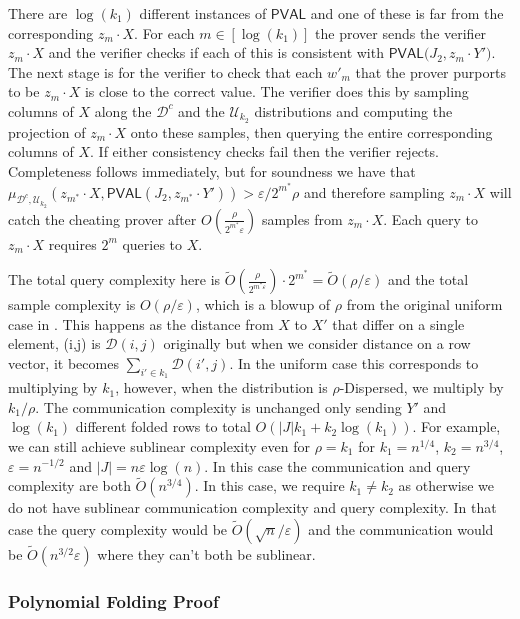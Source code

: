 \documentclass[11pt]{article}
\newcommand{\PVAL}{\mathsf{PVAL}}
\begin{document}
There are $\log (k_{1})$ different instances of $\PVAL$ and one of these is far from the corresponding $z_{m}\cdot X$. For each $m\in [\log (k_{1})]$ the prover sends the verifier $z_{m}\cdot X$  and the verifier checks if each of this is consistent with $\PVAL\bigg(J_{2}, z_{m}\cdot Y'\bigg)$. The next stage is for the verifier to check that each $w'_{m}$ that the prover purports to be $z_{m}\cdot X$ is close to the correct value. The verifier does this by sampling columns of $X$ along the $\mathcal{D}^{c}$ and the $\mathcal{U}_{k_{2}}$ distributions and computing the projection of $z_{m}\cdot X$ onto these samples, then querying the entire corresponding columns of $X$. If either consistency checks fail then the verifier rejects. Completeness follows immediately, but for soundness we have that $\mu_{\mathcal{D}^{c}, \mathcal{U}_{k_{2}}}(z_{m^{\ast}}\cdot X,\PVAL(J_{2}, z_{m^{\ast}}\cdot Y'))>\varepsilon/2^{m^{\ast}}\rho$ and therefore sampling $ z_{m}\cdot X$ will catch the cheating prover after $O(\frac{\rho}{2^{m^{\ast}}\varepsilon})$ samples from $z_{m}\cdot X$. Each query to $z_{m}\cdot X$ requires $2^{m}$ queries to $X$.

The total query complexity here is $\tilde{O}(\frac{\rho}{2^{m^{\ast}\varepsilon}})\cdot 2^{m^{\ast}} =\tilde{O}(\rho/\varepsilon)$ and the total sample complexity is $O(\rho/\varepsilon)$, which is a blowup of $\rho$ from the original uniform case in \cite{RVW}. This happens as the distance from $X$ to $X'$ that differ on a single element, (i,j) is $\mathcal{D}(i,j)$ originally but when we consider distance on a row vector, it becomes $\sum_{i'\in k_{1}}\mathcal{D}(i', j)$. In the uniform case this corresponds to multiplying by $k_{1}$, however, when the distribution is $\rho$-Dispersed, we multiply by $k_{1}/\rho$. The communication complexity is unchanged only sending $Y'$ and $\log(k_{1})$ different folded rows to total $O(|J|k_{1}+k_2 \log (k_{1}))$. For example, we can still achieve sublinear complexity even for $\rho=k_{1}$ for $k_{1}=n^{1/4}$, $k_{2}=n^{3/4}$, $\varepsilon=n^{-1/2}$ and $|J|=n\varepsilon\log (n)$. In this case the communication and query complexity are both $\tilde{O}(n^{3/4})$. In this case, we require $k_{1}\neq k_{2}$ as otherwise we do not have sublinear communication complexity and query complexity. In that case the query complexity would be $\tilde{O}(\sqrt{n}/\varepsilon)$ and the communication would be $\tilde{O}(n^{3/2}\varepsilon)$ where they can't both be sublinear.

\subsubsection{Polynomial Folding Proof}
\end{document}
